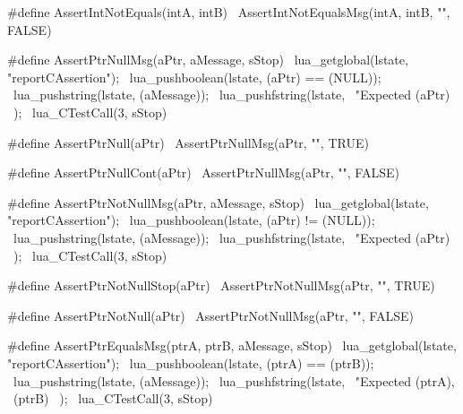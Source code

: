 #define AssertIntNotEquals(intA, intB)         \
  AssertIntNotEqualsMsg(intA, intB, "", FALSE)
\stopCHeader

\stopTestSuite

\startTestSuite[assertPrtNull]

\startCHeader
#define AssertPtrNullMsg(aPtr, aMessage, sStop) \
  lua_getglobal(lstate, "reportCAssertion");    \
  lua_pushboolean(lstate, (aPtr) == (NULL));    \
  lua_pushstring(lstate, (aMessage));           \
  lua_pushfstring(lstate,                       \
      "Expected %
      (aPtr)                                    \
    );                                          \
  lua_CTestCall(3, sStop)

#define AssertPtrNull(aPtr)    \
  AssertPtrNullMsg(aPtr, "", TRUE)

#define AssertPtrNullCont(aPtr)     \
  AssertPtrNullMsg(aPtr, "", FALSE)
\stopCHeader

\stopTestSuite

\startTestSuite[assertPtrNotNull]

\startCHeader
#define AssertPtrNotNullMsg(aPtr, aMessage, sStop) \
  lua_getglobal(lstate, "reportCAssertion");       \
  lua_pushboolean(lstate, (aPtr) != (NULL));       \
  lua_pushstring(lstate, (aMessage));              \
  lua_pushfstring(lstate,                          \
      "Expected %
      (aPtr)                                       \
    );                                             \
  lua_CTestCall(3, sStop)

#define AssertPtrNotNullStop(aPtr)    \
  AssertPtrNotNullMsg(aPtr, "", TRUE)

#define AssertPtrNotNull(aPtr)         \
  AssertPtrNotNullMsg(aPtr, "", FALSE)
\stopCHeader

\stopTestSuite

\startTestSuite[assertPtrEquals]

\startCHeader
#define AssertPtrEqualsMsg(ptrA, ptrB, aMessage, sStop) \
  lua_getglobal(lstate, "reportCAssertion");            \
  lua_pushboolean(lstate, (ptrA) == (ptrB));            \
  lua_pushstring(lstate, (aMessage));                   \
  lua_pushfstring(lstate,                               \
      "Expected %
      (ptrA),                                           \
      (ptrB)                                            \
    );                                                  \
  lua_CTestCall(3, sStop)

